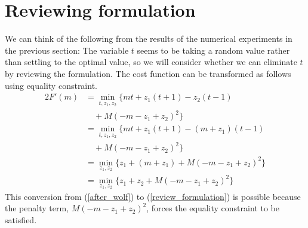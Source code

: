 \documentclass[fp,twocolumn]{jpsj3}
\begin{document}
\section{Reviewing formulation} %
We can think of the following from the results of the numerical experiments in the previous section: The variable $t$ seems to be taking a random value rather than settling to the optimal value, so we will consider whether we can eliminate $t$ by reviewing the formulation. 
The cost function can be transformed as follows using equality constraint.
\begin{alignat}{2}
  F'(m)&=\min_{t,z_{1},z_{2}}{\{mt+z_{1}(t+1)-z_{2}(t-1)} \nonumber \\
  &\quad+M(-m-z_{1}+z_{2})^{2}\} \nonumber \\
  &=\min_{t,z_{1},z_{2}}{\{mt+z_{1}(t+1)-(m+z_{1})(t-1)} \nonumber \\
  &\quad+M(-m-z_{1}+z_{2})^{2}\} \nonumber \\
  &=\min_{z_{1},z_{2}}{\{z_{1}+(m+z_{1})+M(-m-z_{1}+z_{2})^{2}\}} \nonumber \\
  &=\min_{z_{1},z_{2}}{\{z_{1}+z_{2}+M(-m-z_{1}+z_{2})^{2}\}} \label{review_formulation}
\end{alignat}
This conversion from (\ref{after_wolf}) to (\ref{review_formulation}) is possible because the penalty term, $M(-m-z_{1}+z_{2})^{2}$, forces the equality constraint to be satisfied.
\end{document}
